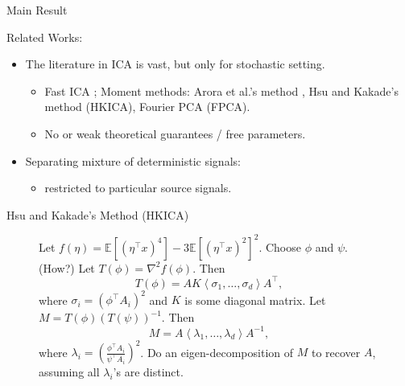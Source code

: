 \documentclass[final]{beamer} %
\newcommand{\EEp}[1]{\mathbb{E}\left[#1\right]}
\begin{document}
\begin{frame}[c]
\begin{columns}[t,totalwidth=\textwidth]
\begin{column}{.32\textwidth}
\begin{block}{Main Result}
\begin{center}
\begin{tcolorbox}[title = \vspace{0.4cm}\textbf{\large Main Result} \vspace{0.4cm}, title filled, width = 0.95\textwidth, colback = uofagreen!10, colframe = red]
				\end{tcolorbox}
			\end{center}
				{\large Related Works:}
			\begin{itemize}
						\item The literature in ICA is vast, but only for stochastic setting.
						\begin{itemize}
							\item Fast ICA \citep{hyvarinen1999fast}; Moment methods:
							Arora et al.'s method \citep{arora2012provable},
							Hsu and Kakade's method \citep{hsu2013learning} (HKICA), 
							Fourier PCA \citep{goyal2014fourier} (FPCA).	
							\item No or weak theoretical guarantees / free parameters.
						\end{itemize}
						\item Separating mixture of deterministic signals: \citet{kirimoto2011separation,forootan2013separation}
						\begin{itemize}
						\item restricted to particular source signals.
						\end{itemize}
					\end{itemize}
		\bigskip
		\end{block}
		\bigskip
			\begin{block}{Hsu and Kakade's Method (HKICA)}
				\begin{figure}
				\begin{algorithmic}[1]
					\STATE Let $f(\eta) = \EEp{(\eta^{\top}x)^4} - 3 \EEp{(\eta^{\top}x)^2}^2$.
					\STATE  Choose $\phi$ and $\psi$. (How?)
					\STATE Let $T(\phi) = \nabla^2 f(\phi)$. Then 
						\[T(\phi) = AK \left\langle \sigma_1,\ldots,  \sigma_d\right\rangle A^{\top},
						\]
						where $\sigma_i = \left(\phi^{\top}A_i\right)^2$ and $K$ is some diagonal matrix.
					\STATE Let $M = T(\phi)(T(\psi))^{-1}$. Then 
						\[M = A \left\langle \lambda_1, \ldots, \lambda_d \right\rangle A^{-1},
						\]
						where $\lambda_i = \left(\frac{\phi^{\top}A_i}{\psi^{\top}A_i}\right)^2$.
						\vspace{0.5cm}
					\STATE Do an eigen-decomposition of $M$ to recover $A$, assuming all $\lambda_i$'s are distinct.
				\end{algorithmic}
				\end{figure}

			\end{block}
	\end{column}


\end{columns}
\end{frame}
\end{document}
